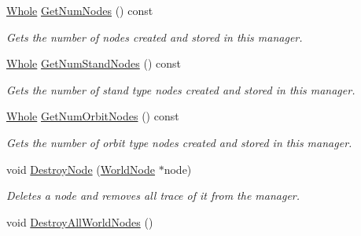 \begin{DoxyCompactItemize}
\hyperlink{namespacephys_a460f6bc24c8dd347b05e0366ae34f34a}{Whole} \hyperlink{classphys_1_1SceneManager_a6ba57b9db1a1bfe2471425d6d8341272}{GetNumNodes} () const 
\begin{DoxyCompactList}\small\item\em Gets the number of nodes created and stored in this manager. \item\end{DoxyCompactList}\item 
\hyperlink{namespacephys_a460f6bc24c8dd347b05e0366ae34f34a}{Whole} \hyperlink{classphys_1_1SceneManager_ab80f76686a3cbf2c2ec49ae7eadf8c95}{GetNumStandNodes} () const 
\begin{DoxyCompactList}\small\item\em Gets the number of stand type nodes created and stored in this manager. \item\end{DoxyCompactList}\item 
\hyperlink{namespacephys_a460f6bc24c8dd347b05e0366ae34f34a}{Whole} \hyperlink{classphys_1_1SceneManager_ac54e082885d9df328aab3f8bcfaaaad2}{GetNumOrbitNodes} () const 
\begin{DoxyCompactList}\small\item\em Gets the number of orbit type nodes created and stored in this manager. \item\end{DoxyCompactList}\item 
void \hyperlink{classphys_1_1SceneManager_a5a2d68ab38308f9c6ac4b659cae36dee}{DestroyNode} (\hyperlink{classphys_1_1WorldNode}{WorldNode} $\ast$node)
\begin{DoxyCompactList}\small\item\em Deletes a node and removes all trace of it from the manager. \item\end{DoxyCompactList}\item 
\hypertarget{classphys_1_1SceneManager_a0a4f1d371b91848f1fac32aac153cc10}{
void \hyperlink{classphys_1_1SceneManager_a0a4f1d371b91848f1fac32aac153cc10}{DestroyAllWorldNodes} ()}
\label{dd/da8/classphys_1_1SceneManager_a0a4f1d371b91848f1fac32aac153cc10}


\end{DoxyCompactItemize}
